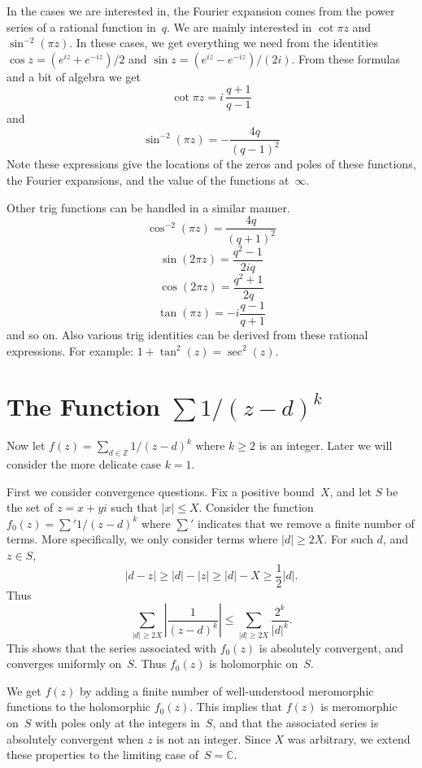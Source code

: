\documentclass {amsart}
\theoremstyle{plain}
\theoremstyle{definition}
\theoremstyle{remark}
\newcommand{\bZ}{{\mathbb{Z}}}
\newcommand{\bC}{{\mathbb{C}}}
\begin{document}
In the cases we are interested in, the Fourier expansion comes from the power series of a rational function in~$q$. We are mainly interested in $\cot \pi z$ and $\sin^{-2} (\pi z)$.
In these cases, we get everything we need from the
identities $\cos z = (e^{iz} + e^{-iz})/2$ and $\sin z = (e^{iz} - e^{-iz})/(2 i)$.
From these formulas and a bit of algebra we get
$$
\cot \pi z = i \, \frac{q + 1}{q - 1}
$$
and
$$
\sin^{-2} (\pi z) = - \frac{4 q}{(q - 1)^2}
$$
Note these expressions give the locations of the zeros and poles of these functions, the
Fourier expansions, and
the value of the functions at~$\infty$.

Other trig functions can be handled in a similar manner.
$$
\cos^{-2} (\pi z) = \frac{4 q}{(q + 1)^2}
$$
$$
\sin(2 \pi z) = \frac{q^2 - 1}{2 i q}
$$
$$
\cos (2 \pi z) =\frac{q^2 + 1}{2 q}
$$
$$
\tan (\pi z) = - i \frac{q - 1}{q + 1}
$$
and so on. Also various trig identities can be derived from these rational expressions.
For example: $1 + \tan^2 (z) = \sec^2(z)$.





\section {The Function $\sum 1/ (z - d)^k$}

Now let $f(z) = \sum_{d \in\bZ}  1/ (z - d)^k$ where $k \ge 2$ is an integer.
Later we will consider the  more delicate case $k=1$.

First we consider convergence questions. Fix a positive bound~$X$, and
let $S$ be the set of $z  = x  + y i$ such that $|x| \le X$. Consider
the function $f_0 (z) =  \sum' 1/ (z - d)^k$ where $\sum'$ indicates that
we remove a finite number of terms. More specifically, we only consider
terms where $|d| \ge 2 X$. For such $d$, and $z \in S$,
$$
|d - z| \ge |d| - |z| \ge |d| - X \ge \frac{1}{2} |d|.
$$
Thus
$$
\sum_{|d| \ge 2 X} \left| \frac{1}{(z-d)^k} \right| \le \sum_{|d| \ge 2 X} \frac{2^k}{|d|^k}.
$$
This shows that the series associated with $f_0(z)$ is absolutely convergent, and converges
uniformly on~$S$. Thus $f_0(z)$ is holomorphic on~$S$.

We get $f(z)$ by adding a finite number of well-understood meromorphic functions
to the holomorphic $f_0(z)$.
This implies that $f(z)$ is meromorphic on~$S$ with poles only at the integers in~$S$,
and that the associated series is absolutely convergent when $z$ is not an integer.
Since $X$ was arbitrary, we extend these properties to the limiting case of~$S = \bC$.
\end{document}
